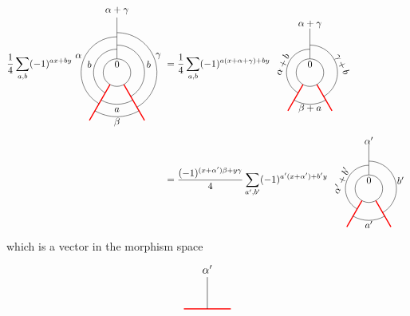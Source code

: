 	\begin{align}
	\frac{1}{4}
	\sum_{a,b}(-1)^{ax+by}
	\begin{tikzpicture}[scale=1,baseline=(current bounding box.center)]
	\draw (0,0) circle (0.5cm);
	\draw[red,line width=0.4mm]
	\foreach \a in {-60, -120} {
		(\a:0.5) -- (\a:2)
	};
	\draw[] (90:0.5) -- (90:2);
	\draw ([shift=(-60:1cm)]0,0) arc (-60:90:1cm);
	\draw ([shift=(-120:1.15cm)]0,0) arc (-120:-60:1.15cm);
	\draw ([shift=(240:0.85cm)]0,0) arc (240:90:0.85cm);
	\draw ([shift=(240:1.3cm)]0,0) arc (240:90:1.3cm);
	\draw ([shift=(-60:1.45cm)]0,0) arc (-60:90:1.45cm);
	\draw ([shift=(-120:1.6cm)]0,0) arc (-120:-60:1.6cm);
	\node at (90:.3cm){$0$};\node at (90:2.25cm){$\alpha+\gamma$};
	\node at (-1,0.3) {$b$};
	\node at (1.15,0.3) {$b$};
	\node at (0,-1.35) {$a$};
	\node at (-1.4,0.6) {$\alpha$};
	\node at (1.5,0.6) {$\gamma$};
	\node at (0,-1.8) {$\beta$};
	\end{tikzpicture}
	&=
	\frac{1}{4}
	\sum_{a,b}(-1)^{a(x+\alpha+\gamma)+by}
	\begin{tikzpicture}[scale=1,baseline=(current bounding box.center)]
	\draw (0,0) circle (0.5cm);
	\draw[red,line width=0.4mm]
	\foreach \a in {-60, -120} {
		(\a:0.5) -- (\a:1.6)
	};
	\draw ([shift=(-60:1cm)]0,0) arc (-60:90:1cm);
	\draw ([shift=(-120:1.15cm)]0,0) arc (-120:-60:1.15cm);
	\draw ([shift=(240:0.85cm)]0,0) arc (240:90:0.85cm);
	\draw[] (90:0.5) -- (90:1.6);
	\node at (90:.3cm){$0$};\node at (90:1.75cm){$\alpha+\gamma$};
	\node[rotate=65] at (-1,0.3) {$\alpha+b$};
	\node[rotate=-65] at (1.15,0.3) {$\gamma+b$};
	\node at (0,-1.3) {$\beta+a$};
	\end{tikzpicture}\\
	&=
	\frac{(-1)^{(x+\alpha^\prime)\beta+y\gamma}}{4}
	\sum_{a^\prime,b^\prime}(-1)^{a^\prime(x+\alpha^\prime)+b^\prime y}
	\begin{tikzpicture}[scale=1,baseline=(current bounding box.center)]
	\draw (0,0) circle (0.5cm);
	\draw[red,line width=0.4mm]
	\foreach \a in {-60, -120} {
		(\a:0.5) -- (\a:1.6)
	};
	\draw ([shift=(-60:1cm)]0,0) arc (-60:90:1cm);
	\draw ([shift=(-120:1.15cm)]0,0) arc (-120:-60:1.15cm);
	\draw ([shift=(240:0.85cm)]0,0) arc (240:90:0.85cm);
	\draw[] (90:0.5) -- (90:1.6);
	\node at (90:.3cm){$0$};\node at (90:1.75cm){$\alpha^\prime$};
	\node[rotate=65] at (-1,0.3) {$\alpha^\prime+b^\prime$};
	\node at (1.15,0.3) {$b^\prime$};
	\node at (0,-1.3) {$a^\prime$};
	\end{tikzpicture}
	\end{align}
which is a vector in the morphism space
	\begin{equation}	
		\begin{tikzpicture}
			\draw[red,line width=0.4mm] (0,0) -- (1.5,0);
			\draw (0.75,0) -- (0.75,1) node [pos=1.25]{$\alpha^\prime$};
		\end{tikzpicture}
	\end{equation}
